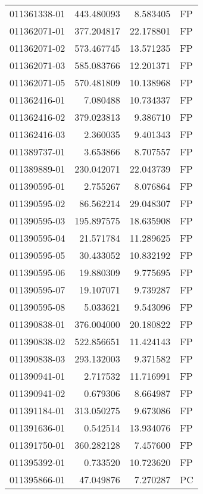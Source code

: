 \begin{tabular}{lrrl}
011361338-01 &  443.480093 &       8.583405 &   FP \\
011362071-01 &  377.204817 &      22.178801 &   FP \\
011362071-02 &  573.467745 &      13.571235 &   FP \\
011362071-03 &  585.083766 &      12.201371 &   FP \\
011362071-05 &  570.481809 &      10.138968 &   FP \\
011362416-01 &    7.080488 &      10.734337 &   FP \\
011362416-02 &  379.023813 &       9.386710 &   FP \\
011362416-03 &    2.360035 &       9.401343 &   FP \\
011389737-01 &    3.653866 &       8.707557 &   FP \\
011389889-01 &  230.042071 &      22.043739 &   FP \\
011390595-01 &    2.755267 &       8.076864 &   FP \\
011390595-02 &   86.562214 &      29.048307 &   FP \\
011390595-03 &  195.897575 &      18.635908 &   FP \\
011390595-04 &   21.571784 &      11.289625 &   FP \\
011390595-05 &   30.433052 &      10.832192 &   FP \\
011390595-06 &   19.880309 &       9.775695 &   FP \\
011390595-07 &   19.107071 &       9.739287 &   FP \\
011390595-08 &    5.033621 &       9.543096 &   FP \\
011390838-01 &  376.004000 &      20.180822 &   FP \\
011390838-02 &  522.856651 &      11.424143 &   FP \\
011390838-03 &  293.132003 &       9.371582 &   FP \\
011390941-01 &    2.717532 &      11.716991 &   FP \\
011390941-02 &    0.679306 &       8.664987 &   FP \\
011391184-01 &  313.050275 &       9.673086 &   FP \\
011391636-01 &    0.542514 &      13.934076 &   FP \\
011391750-01 &  360.282128 &       7.457600 &   FP \\
011395392-01 &    0.733520 &      10.723620 &   FP \\
011395866-01 &   47.049876 &       7.270287 &   PC \\

\end{tabular}
